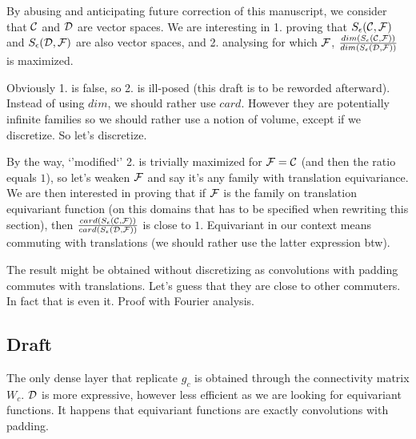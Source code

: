 
By abusing and anticipating future correction of this manuscript, we consider that $\mathcal{C}$ and $\mathcal{D}$ are vector spaces. We are interesting in 1. proving that $S_{\epsilon}(\mathcal{C},\mathcal{F})$ and $S_{\epsilon}(\mathcal{D},\mathcal{F})$ are also vector spaces, and 2. analysing for which $\mathcal{F}$, $\frac{dim(S_{\epsilon}(\mathcal{C},\mathcal{F}))}{dim(S_{\epsilon}(\mathcal{D},\mathcal{F}))}$ is maximized.

Obviously 1. is false, so 2. is ill-posed (this draft is to be reworded afterward). Instead of using $dim$, we should rather use $card$. However they are potentially infinite families so we should rather use a notion of volume, except if we discretize. So let's discretize.

By the way, `'modified`' 2. is trivially maximized for $\mathcal{F} = \mathcal{C}$ (and then the ratio equals $1$), so let's weaken $\mathcal{F}$ and say it's any family with translation equivariance. We are then interested in proving that if $\mathcal{F}$ is the family on translation equivariant function (on this domains that has to be specified when rewriting this section), then $\frac{card(S_{\epsilon}(\mathcal{C},\mathcal{F}))}{card(S_{\epsilon}(\mathcal{D},\mathcal{F}))}$ is close to $1$. Equivariant in our context means commuting with translations (we should rather use the latter expression btw).

The result might be obtained without discretizing as convolutions with padding commutes with translations. Let's guess that they are close to other commuters. In fact that is even it. Proof with Fourier analysis.





\subsection{Draft}

The only dense layer that replicate $g_c$ is obtained through the connectivity matrix $W_c$. $\mathcal{D}$ is more expressive, however less efficient as we are looking for equivariant functions. It happens that equivariant functions are exactly convolutions with padding.


